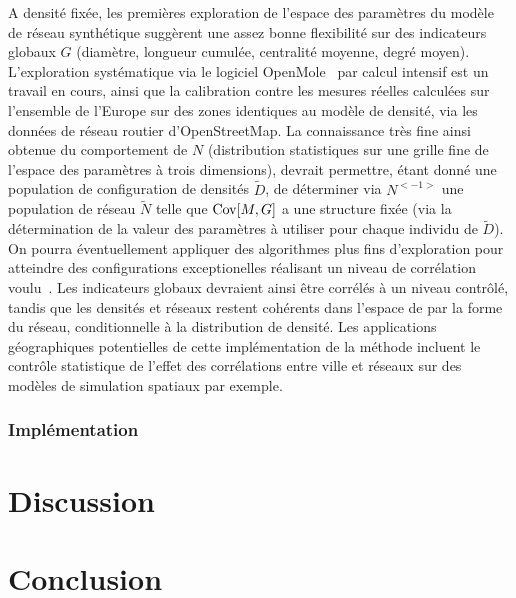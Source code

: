 A densité fixée, les premières exploration de l'espace des paramètres du modèle de réseau synthétique suggèrent une assez bonne flexibilité sur des indicateurs globaux $G$ (diamètre, longueur cumulée, centralité moyenne, degré moyen). L'exploration systématique via le logiciel OpenMole~\cite{reuillon2013openmole} par calcul intensif est un travail en cours, ainsi que la calibration contre les mesures réelles calculées sur l'ensemble de l'Europe sur des zones identiques au modèle de densité, via les données de réseau routier d'OpenStreetMap. La connaissance très fine ainsi obtenue du comportement de $N$ (distribution statistiques sur une grille fine de l'espace des paramètres à trois dimensions), devrait permettre, étant donné une population de configuration de densités $\tilde{D}$, de déterminer via $N^{<-1>}$ une population de réseau $\tilde{N}$ telle que $\operatorname{Cov}\!\left[M,G\right]$ a une structure fixée (via la détermination de la valeur des paramètres à utiliser pour chaque individu de $\tilde{D}$). On pourra éventuellement appliquer des algorithmes plus fins d'exploration pour atteindre des configurations exceptionelles réalisant un niveau de corrélation voulu~\cite{10.1371/journal.pone.0138212}. Les indicateurs globaux devraient ainsi être corrélés à un niveau contrôlé, tandis que les densités et réseaux restent cohérents dans l'espace de par la forme du réseau, conditionnelle à la distribution de densité. Les applications géographiques potentielles de cette implémentation de la méthode incluent le contrôle statistique de l'effet des corrélations entre ville et réseaux sur des modèles de simulation spatiaux par exemple.


\subsubsection{Implémentation}





\section{Discussion}






\section{Conclusion}


